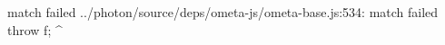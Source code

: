 match failed
../photon/source/deps/ometa-js/ometa-base.js:534: match failed
      throw f;
            ^

